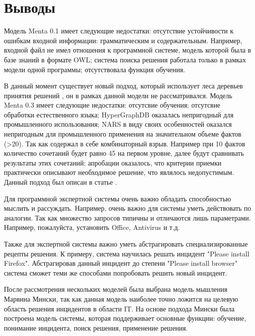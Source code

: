 \section{Выводы}
Модель Menta 0.1 имеет следующие недостатки: отсутствие устойчивости к ошибкам входной информации: грамматическим и содержательным. Например, входной файл не имел отношения к программной системе, модель которой была в базе знаний в формате OWL; система поиска решения работала только в рамках модели одной программы; отсутствовала функция обучения. \par
В данный момент существует новый подход, который использует леса деревьев принятия решений \cite{DCFOREST}, он в рамках данной модели не рассматривался.
Модель Menta 0.3 имеет следующие недостатки: отсутсвие обучения; отсутсвие обработки естественного языка; HyperGraphDB оказалась непригодный для промышленного использования; NARS в виду своих особенностей оказался непригодным для промышленного применения на значительном объеме фактов (>20). Так как содержал в себе комбинаторный взрыв. Например при 10 фактов количество сочетаний будет равно 45 на первом уровне, далее будут сравнивать результаты этих сочетаний; апробации оказалось, что критерии приемки практически описывают необходимое решение, что являлось недопустимым. Данный подход был описан в статье \cite{SECR}. \par

Для программной экспертной системы очень важно обладать способностью мыслить и рассуждать. Например, очень важно  для системы уметь действовать по аналогии. Так как множество запросов типичны и отличаются лишь параметрами. Например, пожалуйста, установить Office, Antivirus и т.д. \par
Также для экспертной системы важно уметь абстрагировать специализированные рецепты решения. К примеру, система научилась решать инцидент "Please install Firefox". Абстрагировав данный инцидент до степени "Please install browser" система сможет теми же способами попробовать решить новый инцидент.\par
После рассмотрения нескольких моделей была выбрана модель мышления Марвина Мински, так как данная модель наиболее точно ложится на целевую область решения инцидентов в области IT. На основе подхода Мински была построена модель системы, которая поддерживает основные функции: обучение, понимание инцидента, поиск решения, применение решения. 

\clearpage


